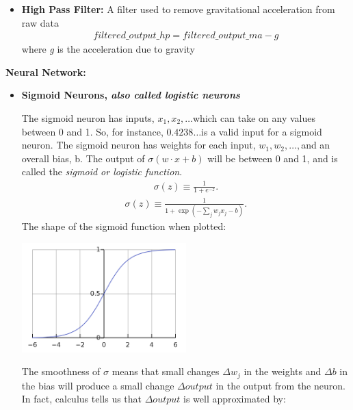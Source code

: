 \documentclass[a4paper, oneside,11pt]{article}
\begin{document}
\begin{itemize}
	\item \textbf{High Pass Filter:}
		A filter used to remove gravitational acceleration from raw data 
		\begin{eqnarray}
		  filtered\_output\_hp = filtered\_output\_ma - \textit{g}
		\end{eqnarray}
		where \textit{g} is the acceleration due to gravity
\end{itemize}

\textbf{Neural Network:}

\begin{itemize}
	\item \textbf{Sigmoid Neurons, \textit{also called logistic neurons}}

		The sigmoid neuron has inputs, \begin{math}x_1, x_2, \ldots \end{math}which can take on any values between 0 and 1. So, for instance, \begin{math}0.4238\ldots \end{math}is a valid input for a sigmoid neuron. The sigmoid neuron has weights for each input, \begin{math}w_1, w_2, \ldots, \end{math}and an overall bias, b.  The output of \begin{math}\sigma(w \cdot x+b)\end{math} will be between 0 and 1, and is called the \textit{sigmoid or logistic function}.
		\begin{eqnarray} 
		  \sigma(z) \equiv \frac{1}{1+e^{-z}}.
		\end{eqnarray}
		\begin{eqnarray} 
		  \sigma(z) \equiv \frac{1}{1+\exp(-\sum_j w_j x_j-b)}.
		\end{eqnarray}
		The shape of the sigmoid function when plotted:
		\begin{center}
			\large{ \includegraphics[width=0.5\textwidth]{sigmoid_function.png}}
		\end{center}
		The smoothness of \begin{math}\sigma\end{math} means that small changes \begin{math}\Delta w_j\end{math} in the weights and \begin{math}\Delta b\end{math} in the bias will produce a small change \begin{math}\Delta output\end{math} in the output from the neuron. In fact, calculus tells us that \begin{math}\Delta output\end{math} is well approximated by:

\end{itemize}
\end{document}

